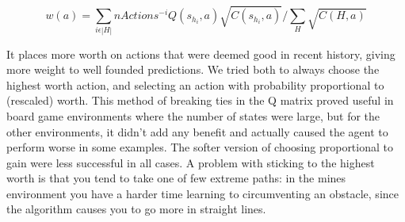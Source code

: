 \begin{equation}
	w(a) = \sum_{i\epsilon |H|} nActions^{-i} Q(s_{h_i},a) \sqrt{C(s_{h_i},a)}/\sum_H \sqrt{C(H,a)}
\end{equation}

It places more worth on actions that were deemed good in recent history, giving more weight to well founded predictions. We tried both to always choose the highest worth action, and selecting an action with probability proportional to (rescaled) worth. This method of breaking ties in the Q matrix proved useful in board game environments  where the number of states were large, but for the other environments, it didn't add any benefit and actually caused the agent to perform worse in some examples. The softer version of choosing proportional to gain were less successful in all cases. A problem with sticking to the highest worth is that you tend to take one of few extreme paths: in the mines environment you have a harder time learning to circumventing an obstacle, since the algorithm causes you to go more in straight lines.